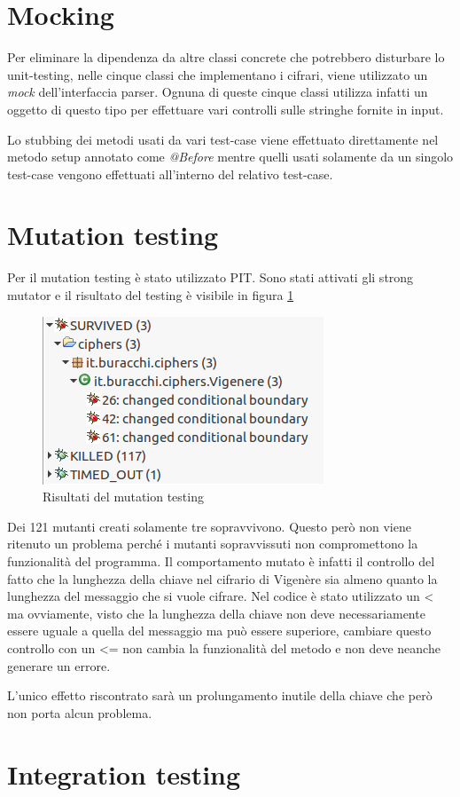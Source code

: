 	\section{Mocking}
		Per eliminare la dipendenza da altre classi concrete che potrebbero disturbare lo unit-testing, nelle cinque classi che implementano i cifrari, viene utilizzato un \emph{mock} dell'interfaccia parser.	Ognuna di queste cinque classi utilizza infatti un oggetto di questo tipo per effettuare vari controlli sulle stringhe fornite in input.
		
		Lo stubbing dei metodi usati da vari test-case viene effettuato direttamente nel metodo setup annotato come \emph{@Before} mentre quelli usati solamente da un singolo test-case vengono effettuati all'interno del relativo test-case.
		
	\section{Mutation testing}
		Per il mutation testing è stato utilizzato PIT. Sono stati attivati gli strong mutator e il risultato del testing è visibile in figura \ref{fig:pit}
		
		\begin{figure}[h]
			\centering
			\includegraphics[scale=0.5]{img/PIT}
			\caption{Risultati del mutation testing}
			\label{fig:pit}
		\end{figure}
		
		Dei 121 mutanti creati solamente tre sopravvivono. Questo però non viene ritenuto un problema perché i mutanti sopravvissuti non compromettono la funzionalità del programma. Il comportamento mutato è infatti il controllo del fatto che la lunghezza della chiave nel cifrario di Vigenère sia almeno quanto la lunghezza del messaggio che si vuole cifrare. Nel codice è stato utilizzato un < ma ovviamente, visto che la lunghezza della chiave non deve necessariamente essere uguale a quella del messaggio ma può essere superiore, cambiare questo controllo con un <= non cambia la funzionalità del metodo e non deve neanche generare un errore.
		
		L'unico effetto riscontrato sarà un prolungamento inutile della chiave che però non porta alcun problema.
		
	\section{Integration testing}